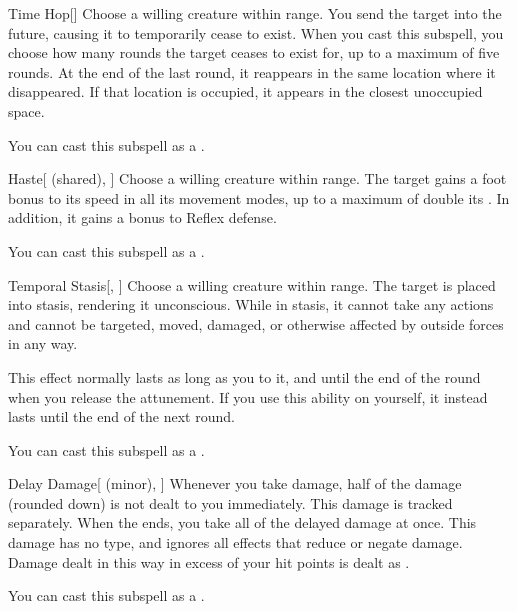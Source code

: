 \begin{ability}[\nth{2}]{Time Hop}[]
Choose a willing creature within \rngmed range.
You send the target into the future, causing it to temporarily cease to exist.
When you cast this subspell, you choose how many rounds the target ceases to exist for, up to a maximum of five rounds.
At the end of the last round, it reappears in the same location where it disappeared.
If that location is occupied, it appears in the closest unoccupied space.

You can cast this subspell as a .
\end{ability}
\vspace{0.25em}


\begin{ability}[\nth{3}]{Haste}[ (shared), ]
Choose a willing creature within \rngmed range.
The target gains a  foot bonus to its speed in all its movement modes, up to a maximum of double its .
In addition, it gains a  bonus to Reflex defense.

You can cast this subspell as a .
\end{ability}
\vspace{0.25em}


\begin{ability}[\nth{3}]{Temporal Stasis}[, ]
Choose a willing creature within \rngclose range.
The target is placed into stasis, rendering it unconscious.
While in stasis, it cannot take any actions and cannot be targeted, moved, damaged, or otherwise affected by outside forces in any way.

This effect normally lasts as long as you  to it, and until the end of the round when you release the attunement.
If you use this ability on yourself, it instead lasts until the end of the next round.

You can cast this subspell as a .
\end{ability}
\vspace{0.25em}


\begin{ability}[\nth{4}]{Delay Damage}[ (minor), ]
Whenever you take damage, half of the damage (rounded down) is not dealt to you immediately.
This damage is tracked separately.
When the ends, you take all of the delayed damage at once.
This damage has no type, and ignores all effects that reduce or negate damage.
Damage dealt in this way in excess of your hit points is dealt as .

You can cast this subspell as a .
\end{ability}
\vspace{0.25em}


